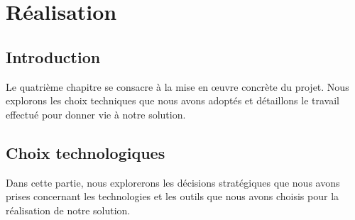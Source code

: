 \chapter{Réalisation}
	
\section*{Introduction}
    Le quatrième chapitre se consacre à la mise en œuvre concrète du projet. Nous explorons les choix techniques que nous avons adoptés et détaillons le travail effectué pour donner vie à notre solution.

\section{Choix technologiques}
\par  Dans cette partie, nous explorerons les décisions stratégiques que nous avons prises concernant les technologies et les outils que nous avons choisis pour la réalisation de notre solution.     
